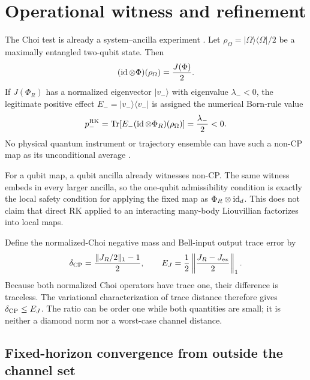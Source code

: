 \section{Operational witness and refinement}
\label{sec:operational}

The Choi test is already a system--ancilla experiment \cite{Choi1975CP,Stinespring1955}. Let $\rho_\Omega=|\Omega\rangle\langle\Omega|/2$ be a maximally entangled two-qubit state. Then
\begin{equation}
 (\operatorname{id}\otimes\Phi)(\rho_\Omega)=\frac{J(\Phi)}{2}.
 \label{eq:bell_choi}
\end{equation}
If $J(\Phi_R)$ has a normalized eigenvector $|v_-\rangle$ with eigenvalue $\lambda_-<0$, the legitimate positive effect $E_-=|v_-\rangle\langle v_-|$ is assigned the numerical Born-rule value
\begin{equation}
 p_-^{\rm RK}=\operatorname{Tr}\!\left[E_-(\operatorname{id}\otimes\Phi_R)(\rho_\Omega)\right]=\frac{\lambda_-}{2}<0.
 \label{eq:negative_born}
\end{equation}
No physical quantum instrument or trajectory ensemble can have such a non-CP map as its unconditional average \cite{DaviesLewis1970,SteinbachGarrawayKnight1995,WonglakhonWisemanChantasri2024}.

For a qubit map, a qubit ancilla already witnesses non-CP. The same witness embeds in every larger ancilla, so the one-qubit admissibility condition is exactly the local safety condition for applying the fixed map as $\Phi_R\otimes\operatorname{id}_d$. This does not claim that direct RK applied to an interacting many-body Liouvillian factorizes into local maps.

Define the normalized-Choi negative mass and Bell-input output trace error by
\begin{equation}
 \delta_{\rm CP}=\frac{\|J_R/2\|_1-1}{2},
 \qquad
 E_J=\frac12\left\|\frac{J_R-J_{\rm ex}}{2}\right\|_1.
 \label{eq:choi_error_definitions}
\end{equation}
Because both normalized Choi operators have trace one, their difference is traceless. The variational characterization of trace distance therefore gives $\delta_{\rm CP}\le E_J$. The ratio can be order one while both quantities are small; it is neither a diamond norm nor a worst-case channel distance.

\subsection{Fixed-horizon convergence from outside the channel set}


